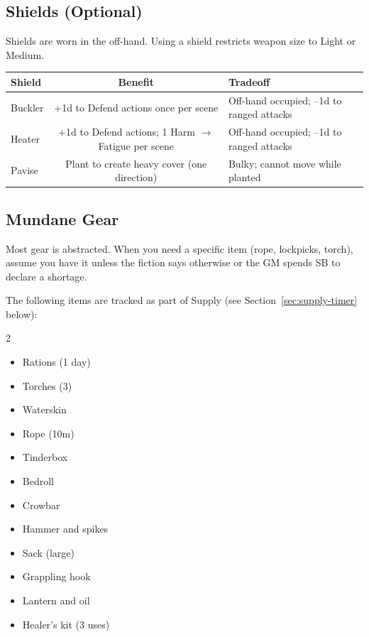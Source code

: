 \subsection{Shields (Optional)}

Shields are worn in the off-hand. Using a shield restricts weapon size to Light or Medium.

\begin{tabular}{@{}lcl@{}}
\toprule
\textbf{Shield} & \textbf{Benefit} & \textbf{Tradeoff} \\
\midrule
Buckler    & +1d to Defend actions once per scene & Off-hand occupied; --1d to ranged attacks \\
Heater     & +1d to Defend actions; 1 Harm $\rightarrow$ Fatigue per scene & Off-hand occupied; --1d to ranged attacks \\
Pavise     & Plant to create heavy cover (one direction) & Bulky; cannot move while planted \\
\bottomrule
\end{tabular}

\subsection{Mundane Gear}

Most gear is abstracted. When you need a specific item (rope, lockpicks, torch), assume you have it unless the fiction says otherwise or the GM spends SB to declare a shortage.

The following items are tracked as part of Supply (see Section~\ref{sec:supply-timer} below):

\begin{multicols}{2}
\begin{itemize}
  \item Rations (1 day)
  \item Torches (3)
  \item Waterskin
  \item Rope (10m)
  \item Tinderbox
  \item Bedroll
  \item Crowbar
  \item Hammer and spikes
  \item Sack (large)
  \item Grappling hook
  \item Lantern and oil
  \item Healer's kit (3 uses)
\end{itemize}
\end{multicols}

